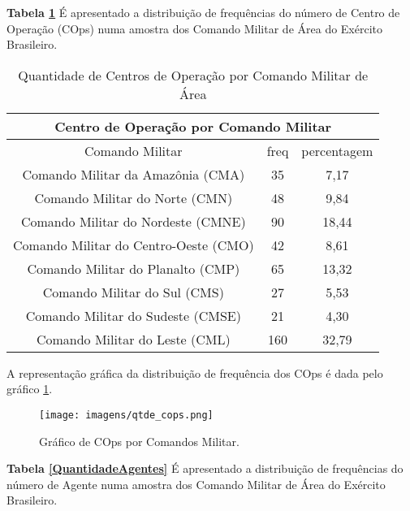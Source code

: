 \hspace{1.5cm}
\textbf{Tabela \ref{QuantidadeCops}} É apresentado a distribuição de frequências do número de Centro de Operação (COps) numa amostra dos Comando Militar de Área do Exército Brasileiro. 

\begin{table}[H]
\centering
\begin{tabular}{|c | c| c|} 
 \multicolumn{3}{c}{Centro de Operação por Comando Militar}\\ \hline
  Comando Militar & freq  & percentagem \\ [0.5ex] 
 \hline
 Comando Militar da Amazônia (CMA) & 35 & 7,17 \\ 
 \hline
 Comando Militar do Norte (CMN) & 48 & 9,84\\
 \hline
 Comando Militar do Nordeste (CMNE) &  90 & 18,44\\
 \hline
 Comando Militar do Centro-Oeste (CMO) & 42 & 8,61\\
 \hline
 Comando Militar do Planalto (CMP) &  65 & 13,32\\
 \hline
 Comando Militar do Sul (CMS) &  27 & 5,53\\
 \hline
 Comando Militar do Sudeste (CMSE) &  21 & 4,30\\
 \hline
 Comando Militar do Leste (CML) &  160 & 32,79\\ [1ex] 
 \hline
\end{tabular}
\caption{Quantidade de Centros de Operação por Comando Militar de Área}
\label{QuantidadeCops}
\end{table}

\hspace{1.5cm}
A representação gráfica da distribuição de frequência dos COps é dada pelo gráfico \ref{figuraCops}.
\begin{figure}[H]
        \centering
        \texttt{[image: imagens/qtde\_cops.png]}
        \caption{Gráfico de COps por Comandos Militar.}
        \label{figuraCops}
\end{figure}

\hspace{1.5cm}
\textbf{Tabela \ref{QuantidadeAgentes}} É apresentado a distribuição de frequências do número de Agente numa amostra dos Comando Militar de Área do Exército Brasileiro. 

